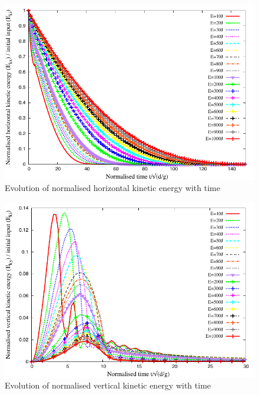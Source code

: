 \begin{figure}[tbhp]
\centering
\includegraphics[width=\textwidth]{Normalised_KEx_Slope}
\caption{Evolution of normalised horizontal kinetic energy with time}
\label{fig:Normalised_KEx_Slope}
\end{figure}

\begin{figure}[tbhp]
\centering
\includegraphics[width=\textwidth]{Normalised_KEy_Slope}
\caption{Evolution of normalised vertical kinetic energy with time}
\label{fig:Normalised_KEy_Slope}
\end{figure}

